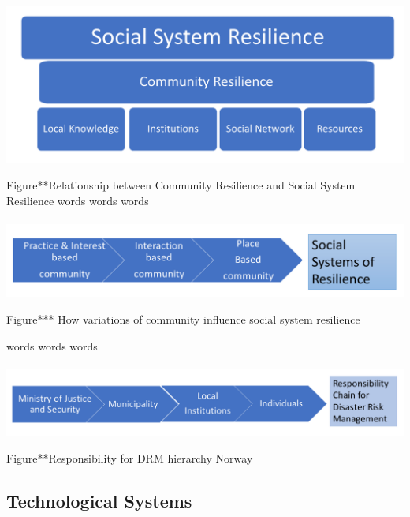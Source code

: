 \paragraph{}
\includegraphics[width=1\textwidth]{fig_theory/social system hierarchy.png}
\begin{frame}{Figure**Relationship between Community Resilience and Social System Resilience}
words words words
\paragraph{}
\includegraphics[width=1\textwidth]{fig_theory/community and social systems.png}
\begin{frame}{Figure*** How variations of community influence social system resilience}
    
\end{frame}
words words words
\paragraph{}
\includegraphics[width=1\textwidth]{fig_theory/responsibility drm.png}
\begin{frame}{Figure**Responsibility for DRM hierarchy Norway}
    
\end{frame}
    
\end{frame}

\subsection{Technological Systems}

